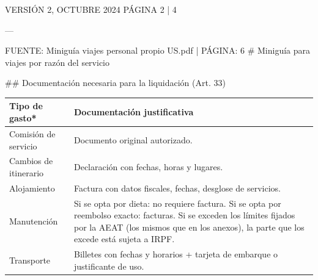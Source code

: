 \documentclass{article}
\begin{document}
\begin{itemize}
\begin{itemize}
\begin{scriptsize}
                  VERSIÓN 2, OCTUBRE 2024    PÁGINA 2 | 4

                  ---

                  FUENTE: Miniguía viajes personal propio US.pdf | PÁGINA: 6
                  \# Miniguía para viajes por razón del servicio

                  \#\# Documentación necesaria para la liquidación (Art. 33)

                  \vspace{0.4cm}
                  \begin{table}[h!]\centering\renewcommand{\arraystretch}{1.3}
                    \begin{tabular}{|p{}|p{}|}\hline
                      Tipo de gasto*                & Documentación justificativa                                                                                                                                                                                     \\\hline
                      Comisión de servicio          & Documento original autorizado.                                                                                                                                                                                  \\\hline
                      Cambios de itinerario         & Declaración con fechas, horas y lugares.                                                                                                                                                                        \\\hline
                      Alojamiento                   & Factura con datos fiscales, fechas, desglose de servicios.                                                                                                                                                      \\\hline
                      Manutención                   & Si se opta por dieta: no requiere factura. Si se opta por reembolso exacto: facturas. Si se exceden los límites fijados por la AEAT (los mismos que en los anexos), la parte que los excede está sujeta a IRPF. \\\hline
                      Transporte                    & Billetes con fechas y horarios + tarjeta de embarque o justificante de uso.                                                                                                                                     \\\hline

\end{tabular}
\end{table}
\end{scriptsize}
\end{itemize}
\end{itemize}
\end{document}
